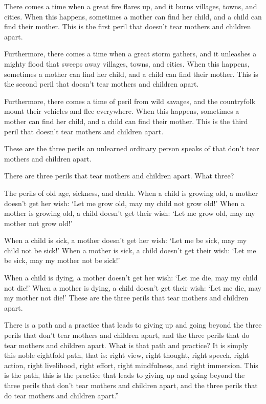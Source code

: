 \documentclass[12pt,openany]{book}%
\begin{document}
There comes a time when a great fire flares up, and it burns villages, towns, and cities. When this happens, sometimes a mother can find her child, and a child can find their mother. This is the first peril that doesn’t tear mothers and children apart. 

Furthermore, there comes a time when a great storm gathers, and it unleashes a mighty flood that sweeps away villages, towns, and cities. When this happens, sometimes a mother can find her child, and a child can find their mother. This is the second peril that doesn’t tear mothers and children apart. 

Furthermore, there comes a time of peril from wild savages, and the countryfolk mount their vehicles and flee everywhere. When this happens, sometimes a mother can find her child, and a child can find their mother. This is the third peril that doesn’t tear mothers and children apart. 

These are the three perils an unlearned ordinary person speaks of that don’t tear mothers and children apart. 

There are three perils that tear mothers and children apart. What three? 

The perils of old age, sickness, and death. When a child is growing old, a mother doesn’t get her wish: ‘Let me grow old, may my child not grow old!’ When a mother is growing old, a child doesn’t get their wish: ‘Let me grow old, may my mother not grow old!’ 

When a child is sick, a mother doesn’t get her wish: ‘Let me be sick, may my child not be sick!’ When a mother is sick, a child doesn’t get their wish: ‘Let me be sick, may my mother not be sick!’ 

When a child is dying, a mother doesn’t get her wish: ‘Let me die, may my child not die!’ When a mother is dying, a child doesn’t get their wish: ‘Let me die, may my mother not die!’ These are the three perils that tear mothers and children apart. 

There is a path and a practice that leads to giving up and going beyond the three perils that don’t tear mothers and children apart, and the three perils that do tear mothers and children apart. What is that path and practice? It is simply this noble eightfold path, that is: right view, right thought, right speech, right action, right livelihood, right effort, right mindfulness, and right immersion. This is the path, this is the practice that leads to giving up and going beyond the three perils that don’t tear mothers and children apart, and the three perils that do tear mothers and children apart.” 
\end{document}
